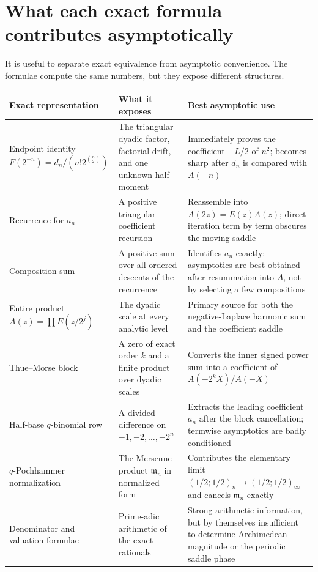 \documentclass[11pt,oneside]{article}
\theoremstyle{definition}
\theoremstyle{remark}
\newcommand{\M}{\mathfrak m}
\begin{document}
\section{What each exact formula contributes asymptotically}
\label{sec:formula-audit}

It is useful to separate exact equivalence from asymptotic convenience.  The formulae compute
the same numbers, but they expose different structures.

\begingroup\small
\begin{longtable}{@{}
  >{\raggedright\arraybackslash}p{}
  >{\raggedright\arraybackslash}p{}
  >{\raggedright\arraybackslash}p{}@{}}
\toprule
Exact representation & What it exposes & Best asymptotic use\\
\midrule
\endhead
Endpoint identity
$F(2^{-n})=d_n/(n!2^{\binom n2})$ &
The triangular dyadic factor, factorial drift, and one unknown half moment &
Immediately proves the coefficient $-L/2$ of $n^2$; becomes sharp after $d_n$ is compared
with $A(-n)$\\
\addlinespace
Recurrence for $a_n$ &
A positive triangular coefficient recursion &
Reassemble into $A(2z)=E(z)A(z)$; direct iteration term by term obscures the moving saddle\\
\addlinespace
Composition sum &
A positive sum over all ordered descents of the recurrence &
Identifies $a_n$ exactly; asymptotics are best obtained after resummation into $A$, not by
selecting a few compositions\\
\addlinespace
Entire product $A(z)=\prod E(z/2^j)$ &
The dyadic scale at every analytic level &
Primary source for both the negative-Laplace harmonic sum and the coefficient saddle\\
\addlinespace
Thue--Morse block &
A zero of exact order $k$ and a finite product over dyadic scales &
Converts the inner signed power sum into a coefficient of $A(-2^kX)/A(-X)$\\
\addlinespace
Half-base $q$-binomial row &
A divided difference on $-1,-2,\ldots,-2^n$ &
Extracts the leading coefficient $a_n$ after the block cancellation; termwise asymptotics
are badly conditioned\\
\addlinespace
$q$-Pochhammer normalization &
The Mersenne product $\M_n$ in normalized form &
Contributes the elementary limit
$(1/2;1/2)_n\to(1/2;1/2)_\infty$ and cancels $\M_n$ exactly\\
\addlinespace
Denominator and valuation formulae &
Prime-adic arithmetic of the exact rationals &
Strong arithmetic information, but by themselves insufficient to determine Archimedean
magnitude or the periodic saddle phase\\
\bottomrule
\end{longtable}
\endgroup
\end{document}
